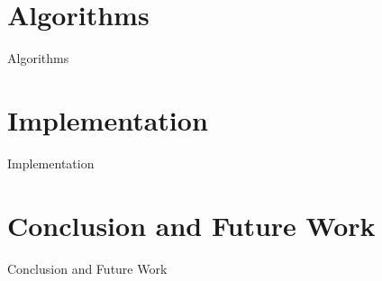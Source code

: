 \documentclass{beamer}
\begin{document}

\section{Algorithms}

\begin{frame}{Algorithms}
  
\end{frame}


\section{Implementation}

\begin{frame}{Implementation}
  
\end{frame}


\section{Conclusion and Future Work}

\begin{frame}{Conclusion and Future Work}
  
\end{frame}



\end{document}
